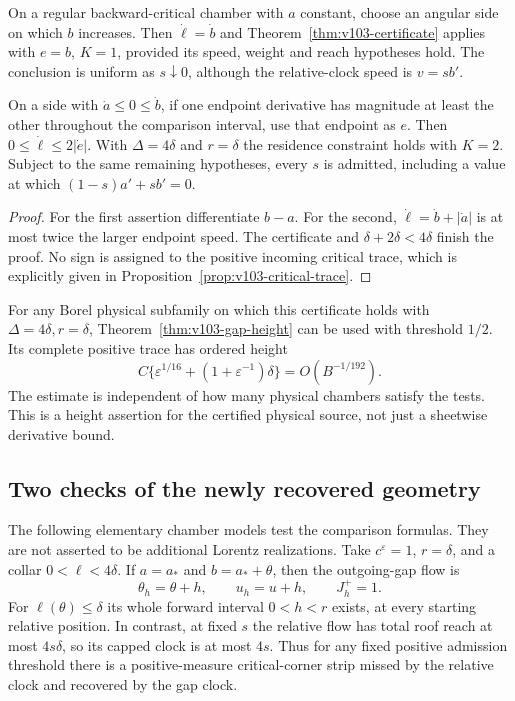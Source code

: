 \begin{corollary}
\label{cor:v103-corners}
On a regular backward-critical chamber with $a$ constant, choose
an angular side on which $b$ increases. Then $\dot\ell=\dot b$
and Theorem~\ref{thm:v103-certificate} applies with $e=b$, $K=1$,
provided its speed, weight and reach hypotheses hold. The conclusion
is uniform as $s\downarrow0$, although the relative-clock speed is
$v=sb'$.

On a side with $\dot a\le0\le\dot b$, if one endpoint derivative
has magnitude at least the other throughout the comparison interval,
use that endpoint as $e$. Then
$0\le\dot\ell\le2|\dot e|$. With $\Delta=4\delta$ and $r=\delta$
the residence constraint holds with $K=2$. Subject to the same
remaining hypotheses, every $s$ is admitted, including a value at
which $(1-s)a'+sb'=0$.
\end{corollary}
\begin{proof}
For the first assertion differentiate $b-a$. For the second,
$\dot\ell=\dot b+|\dot a|$ is at most twice the larger endpoint
speed. The certificate and $\delta+2\delta<4\delta$ finish the
proof. No sign is assigned to the positive incoming critical trace,
which is explicitly given in Proposition~\ref{prop:v103-critical-trace}.
\end{proof}

For any Borel physical subfamily on which this certificate holds
with $\Delta=4\delta,r=\delta$, Theorem~\ref{thm:v103-gap-height}
can be used with threshold $1/2$. Its complete positive trace has
ordered height
\begin{equation}\label{eq:v103-certificate-height}
 C\{\varepsilon^{1/16}+(1+\varepsilon^{-1})\delta\}
                                      =O(B^{-1/192}).
\end{equation}
The estimate is independent of how many physical chambers satisfy
the tests. This is a height assertion for the certified physical
source, not just a sheetwise derivative bound.

\subsection{Two checks of the newly recovered geometry}
The following elementary chamber models test the comparison formulas.
They are not asserted to be additional Lorentz realizations. Take
$c^\varepsilon=1$, $r=\delta$, and a collar $0<\ell<4\delta$.
If $a=a_*$ and $b=a_*+\theta$, then the outgoing-gap flow is
\[
 \theta_h=\theta+h,\qquad u_h=u+h,\qquad J_h^+=1.
\]
For $\ell(\theta)\le\delta$ its whole forward interval $0<h<r$
exists, at every starting relative position. In contrast, at fixed
$s$ the relative flow has total roof reach at most $4s\delta$,
so its capped clock is at most $4s$. Thus for any fixed positive
admission threshold there is a positive-measure critical-corner
strip missed by the relative clock and recovered by the gap clock.

